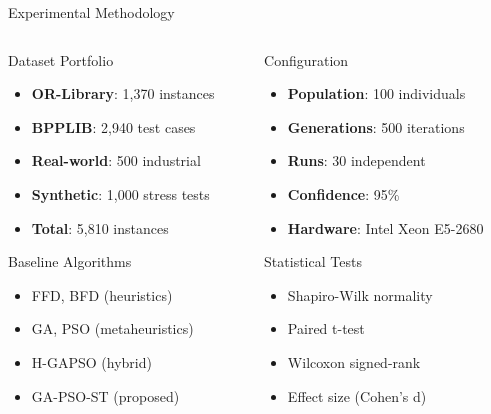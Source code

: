 \documentclass[aspectratio=169,12pt]{beamer}
\begin{document}
\begin{frame}{Experimental Methodology}
\begin{columns}[T]
\begin{column}{0.5\textwidth}
\vspace{-0.4cm}
\begin{block}{Dataset Portfolio}
\begin{itemize}
    \item \textbf{OR-Library}: 1,370 instances
    \item \textbf{BPPLIB}: 2,940 test cases
    \item \textbf{Real-world}: 500 industrial
    \item \textbf{Synthetic}: 1,000 stress tests
    \item \textbf{Total}: 5,810 instances
\end{itemize}
\end{block}
\vspace{-0.1cm}
\begin{block}{Baseline Algorithms}
\begin{itemize}
    \item FFD, BFD (heuristics)
    \item GA, PSO (metaheuristics)
    \item H-GAPSO (hybrid)
    \item GA-PSO-ST (proposed)
\end{itemize}
\end{block}
\end{column}
\begin{column}{0.5\textwidth}
\vspace{-0.4cm}
\begin{block}{Configuration}

\begin{itemize}
    \item \textbf{Population}: 100 individuals
    \item \textbf{Generations}: 500 iterations
    \item \textbf{Runs}: 30 independent
    \item \textbf{Confidence}: 95\%
    \item \textbf{Hardware}: Intel Xeon E5-2680
\end{itemize}
\end{block}

\vspace{-0.1cm}
\begin{exampleblock}{Statistical Tests}
\begin{itemize}
    \item Shapiro-Wilk normality
    \item Paired t-test
    \item Wilcoxon signed-rank
    \item Effect size (Cohen's d)
\end{itemize}
\end{exampleblock}
\end{column}
\end{columns}
\end{frame}
\end{document}
